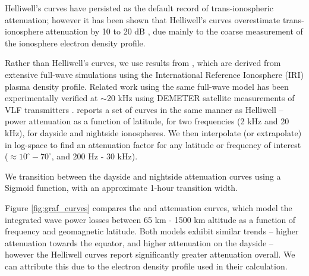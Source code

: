Helliwell's curves have persisted as the default record of trans-ionospheric attenuation; however it has been shown that Helliwell's curves overestimate trans-ionosphere attenuation by 10 to 20 dB \citep{Starks2008}, due mainly to the coarse measurement of the ionosphere electron density profile.

Rather than Helliwell's curves, we use results from \cite{Graf2013}, which are derived from extensive full-wave simulations using the International Reference Ionosphere (IRI) plasma density profile. Related work using the same full-wave model has been experimentally verified at $\sim$20 kHz using DEMETER satellite measurements of VLF transmitters \citep{Cohen2012}. \citeauthor{Graf2013} reports a set of curves in the same manner as Helliwell -- power attenuation as a function of latitude, for two frequencies (2 kHz and 20 kHz), for dayside and nightside ionospheres. We then interpolate (or extrapolate) in log-space to find an attenuation factor for any latitude or frequency of interest ($\approx 10^\circ - 70^\circ$, and 200 Hz - 30 kHz).

We transition between the dayside and nightside attenuation curves using a Sigmoid function, with an approximate 1-hour transition width.

Figure \ref{fig:graf_curves} compares the \cite{Graf2013} and \cite{Helliwell1965} attenuation curves, which model the integrated wave power losses between 65 km - 1500 km altitude as a function of frequency and geomagnetic latitude. Both models exhibit similar trends -- higher attenuation towards the equator, and higher attenuation on the dayside -- however the Helliwell curves report significantly greater attenuation overall. We can attribute this due to the electron density profile used in their calculation.


